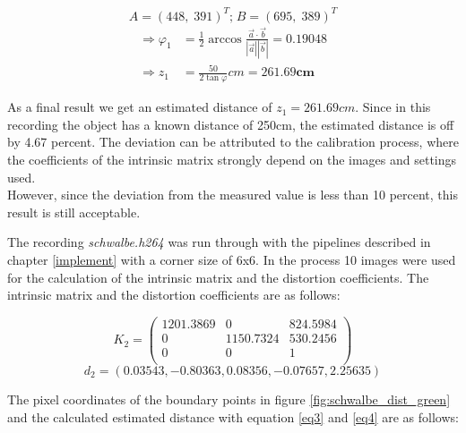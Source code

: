 \begin{equation*}
    A = (448,\;391)^{T}\text{;}\; B = (695,\;389)^{T}
\end{equation*}
\begin{align*}
    \Rightarrow \varphi_1 &= \frac{1}{2}\arccos{\frac{\vec{a} \cdot \vec{b}}{|\vec{a}||\vec{b}|}} = \bm{0.19048}\\
    \Rightarrow  z_1 &= \frac{50}{2\tan\varphi}cm = \bm{261.69cm}
\end{align*}
\vspace{-.25\baselineskip}

As a final result we get an estimated distance of $z_1 = 261.69cm$. Since in this recording the object has a known distance of 250cm, the estimated distance is off by 4.67 percent. The deviation can be attributed to the calibration process, where the coefficients of the intrinsic matrix strongly depend on the images and settings used.\\

However, since the deviation from the measured value is less than 10 percent, this result is still acceptable.

\newpage

The recording \textit{schwalbe.h264} was run through with the pipelines described in chapter \ref{implement} with a corner size of 6x6. In the process 10 images were used for the calculation of the intrinsic matrix and the distortion coefficients. The intrinsic matrix and the distortion coefficients are as follows:

\vspace{1mm}
\begin{equation*}
    K_2 = 
    \begin{pmatrix}
        1201.3869 & 0 & 824.5984\\
        0 & 1150.7324 & 530.2456\\
        0 & 0 & 1\\
    \end{pmatrix}
\end{equation*}
\vspace{1mm}
\begin{equation*}
    d_2 = (0.03543, -0.80363,  0.08356, -0.07657,  2.25635)
\end{equation*}

The pixel coordinates of the boundary points in figure \ref{fig:schwalbe_dist_green} and the calculated estimated distance with equation \ref{eq3} and \ref{eq4} are as follows:

